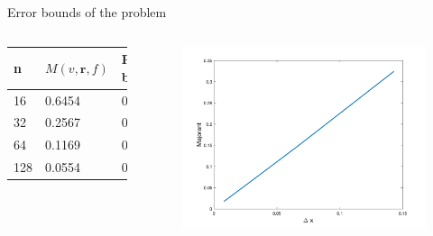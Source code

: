 \documentclass{beamer}
\begin{document}
    \begin{frame}{Error bounds of the problem}
        \begin{columns}
            \begin{table}[]
                \begin{tabular}{l|ll}
                \textbf{n} & $M(v, \bm{r}, f)$ & R.E. bound \\ \hline
                16         & 0.6454  &  0.1530 \\
                32         & 0.2567  &  0.0444 \\
                64         & 0.1169  &  0.0179 \\
                128        & 0.0554  &  0.0084       
                \end{tabular}
                \end{table}
            \begin{figure}
                \includegraphics[scale=0.16]{majorant.png}
            \end{figure}
        \end{columns}
    \end{frame}
\end{document}

